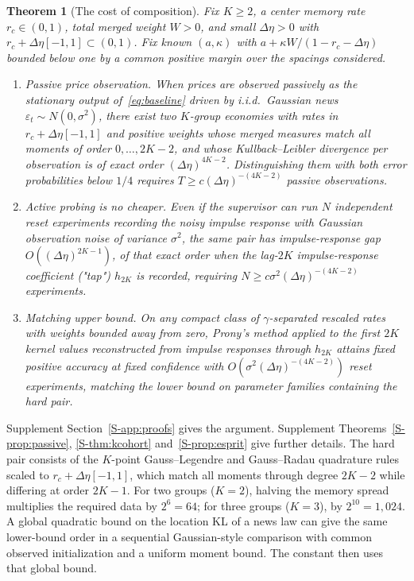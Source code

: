 \documentclass[11pt,letterpaper]{article}
\newtheorem{theorem}{Theorem}[section]
\theoremstyle{definition}
\begin{document}
\begin{theorem}[The cost of composition]\label{n:cost}
Fix $K \ge 2$, a center memory rate $r_c \in (0,1)$, total merged weight $W > 0$, and small $\Delta\eta>0$ with $r_c+\Delta\eta[-1,1]\subset(0,1)$. Fix known $(a,\kappa)$ with $a+\kappa W/(1-r_c-\Delta\eta)$ bounded below one by a common positive margin over the spacings considered.
\begin{enumerate}
  \item[(i)] \emph{Passive price observation.} When prices are observed passively as the stationary output of~\eqref{eq:baseline} driven by i.i.d.\ Gaussian news $\varepsilon_t \sim N(0, \sigma^2)$, there exist two $K$-group economies with rates in $r_c + \Delta\eta[-1,1]$ and positive weights whose merged measures match all moments of order $0, \dots, 2K-2$, and whose Kullback--Leibler divergence per observation is of exact order $(\Delta\eta)^{4K-2}$. Distinguishing them with both error probabilities below $1/4$ requires $T \ge c (\Delta\eta)^{-(4K-2)}$ passive observations.
  \item[(ii)] \emph{Active probing is no cheaper.} Even if the supervisor can run $N$ independent reset experiments recording the noisy impulse response with Gaussian observation noise of variance $\sigma^2$, the same pair has impulse-response gap $O((\Delta\eta)^{2K-1})$, of that exact order when the lag-$2K$ impulse-response coefficient ("tap") $h_{2K}$ is recorded, requiring $N \ge c \sigma^2 (\Delta\eta)^{-(4K-2)}$ experiments.
  \item[(iii)] \emph{Matching upper bound.} On any compact class of $\gamma$-separated rescaled rates with weights bounded away from zero, Prony's method applied to the first $2K$ kernel values reconstructed from impulse responses through $h_{2K}$ attains fixed positive accuracy at fixed confidence with $O(\sigma^2(\Delta\eta)^{-(4K-2)})$ reset experiments, matching the lower bound on parameter families containing the hard pair.
\end{enumerate}
\end{theorem}

Supplement Section~\ref{S-app:proofs} gives the argument. Supplement Theorems~\ref{S-prop:passive}, \ref{S-thm:kcohort} and~\ref{S-prop:esprit} give further details. The hard pair consists of the $K$-point Gauss--Legendre and Gauss--Radau quadrature rules scaled to $r_c + \Delta\eta[-1,1]$, which match all moments through degree $2K-2$ while differing at order $2K-1$. For two groups ($K=2$), halving the memory spread multiplies the required data by $2^6 = 64$; for three groups ($K=3$), by $2^{10} = 1{,}024$. A global quadratic bound on the location KL of a news law can give the same lower-bound order in a sequential Gaussian-style comparison with common observed initialization and a uniform moment bound. The constant then uses that global bound.
\end{document}

